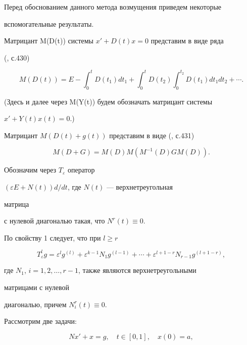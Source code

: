 Перед обоснованием данного метода возмущения приведем некоторые


вспомогательные результаты.


Матрицант M(D(t)) системы $x'+D(t)x=0$ представим в виде ряда


(\cite{Gan}, с.430)


\begin{equation}


M(D(t))=E-\int^t_0D(t_1)dt_1+\int^t_0D(t_2)


\int^{t_2}_0D(t_1)dt_1dt_2+\dotsb.


\end{equation}


(Здесь и далее через M(Y(t)) будем обозначать матрицант системы


$x'+Y(t)x(t)=0$.)


Матрицант $M(D(t)+g(t))$ представим в виде (\cite{Gan}, с.431)


\begin{equation}


M(D+G)=M(D)M(M^{-1}(D)GM(D)).


\end{equation}


Обозначим через $T_\varepsilon$ оператор


$(\varepsilon E+N(t))d/dt$, где $N(t)$ --- верхнетреугольная


матрица


с нулевой диагональю такая, что $N^r(t)\equiv 0$.


По свойству 1 следует, что при $l\ge r$


\begin{equation}


T^l_\varepsilon g=\varepsilon^lg^{(l)}+


\varepsilon^{k-1}N_1g^{(l-1)}+\dotsb+


\varepsilon^{l+1-r}N_{r-1}g^{(l+1-r)},


\end{equation}


где $N_1$, $i=1,2,\dotsc,r-1$, также являются верхнетреугольными


матрицами с нулевой


диагональю, причем $N^r_i(t)\equiv 0$.





Рассмотрим две задачи:


\begin{equation}


Nx'+x=g,\quad t\in[0,1],\quad x(0)=a,


\end{equation}


